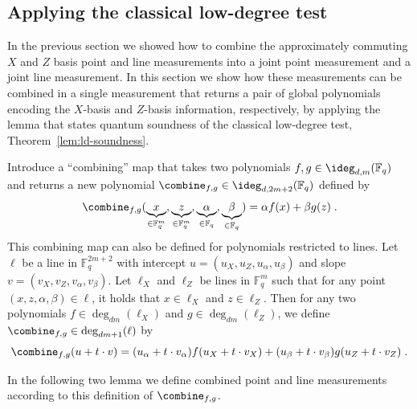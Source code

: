 \documentclass[11pt]{article}
\theoremstyle{definition}
\newcommand{\F}{\ensuremath{\mathbb{F}}}
\renewcommand{\line}{\mathbf{\ell}}
\begin{document}
      \subsection{Applying the classical low-degree test}
      \label{sec:apply-ldt}
      In the previous section we showed how to combine the
      approximately commuting $X$ and $Z$ basis point and line
      measurements into a joint point measurement and a joint line
      measurement. In this section we show how these measurements can be combined
			in a single measurement
      that returns a pair of global polynomials encoding the $X$-basis and
      $Z$-basis information, respectively, by applying the lemma that states quantum soundness of the classical low-degree test, Theorem~\ref{lem:ld-soundness}.
			
      Introduce a ``combining'' map that
      takes two polynomials $f, g \in \ideg_{d,m}(\F_q)$ and returns a new polynomial $\combine_{f,g} \in \ideg_{d,
        2m+2}(\F_q)$ defined by
      \[ \combine_{f,g}(\underbrace{x}_{\in \F_q^{m}},
        \underbrace{z}_{\in \F_q^m}, \underbrace{\alpha}_{\in \F_q},
        \underbrace{\beta}_{\in \F_q}) = \alpha f(x) + \beta g(z)\;. \]
      This combining map can also be defined for polynomials restricted to lines. Let $\line$ be a line in $\F_q^{2m+2}$ with intercept $u = (u_X, u_Z, u_\alpha, u_\beta)$ and slope $v = (v_X, v_Z, v_\alpha, v_\beta)$. Let $\line_X$ and $\line_Z$ be lines in $\F_q^{m}$ such that for any point $(x,z,\alpha,\beta) \in \line$, it holds that $x \in \line_X$ and $z \in \line_Z$. Then for any two polynomials $f \in \deg_{dm}(\line_X)$ and $g \in \deg_{dm}(\line_Z)$, we define $\combine_{f,g} \in \deg_{dm + 1}(\line)$ by
      \begin{equation}
        \combine_{f,g}(u + t \cdot v) = (u_\alpha + t\cdot v_\alpha) f(u_X + t \cdot v_X) + (u_\beta + t \cdot v_\beta) g(u_Z + t \cdot v_Z)\;. \label{eq:combine-lines}
      \end{equation}
      

      In the following two lemma we define combined point and line
      measurements according to this definition of $\combine_{f,g}$.
\end{document}
